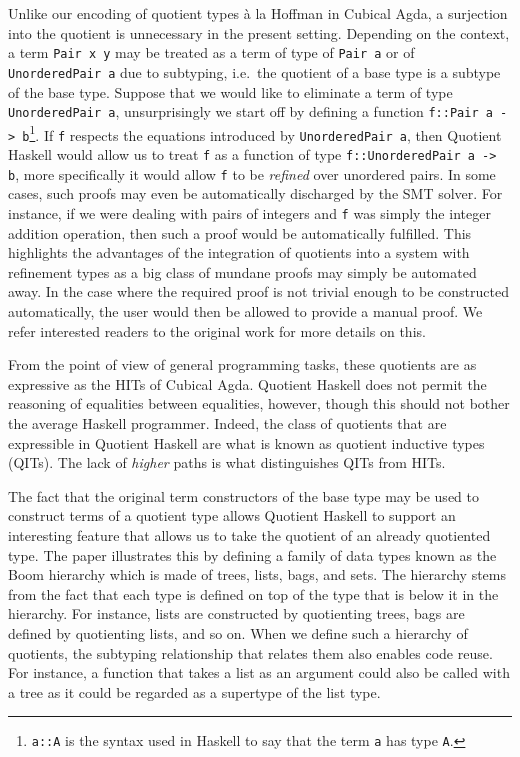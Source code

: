 \documentclass[12pt,twoside,maitrise]{dms}
\theoremstyle{definition}
\numberwithin{equation}{section}
\numberwithin{table}{chapter}
\numberwithin{figure}{chapter}
\newcommand\id[1] {\texttt{#1}}
\newcommand\fn[1] {\texttt{#1}}
\begin{document}
Unlike our encoding of quotient types à la Hoffman\cite{hofmann1995extensional}
in Cubical Agda, a surjection into the quotient is unnecessary in the present
setting. Depending on the context, a term \fn{Pair x y} may be treated as a term
of type of \fn{Pair a} or of \fn{UnorderedPair a} due to subtyping, i.e.\ the
quotient of a base type is a subtype of the base type. Suppose that we would
like to eliminate a term of type \fn{UnorderedPair a}, unsurprisingly we start
off by defining a function \fn{f::Pair a -> b}\footnote{\fn{a::A} is the syntax
used in Haskell to say that the term \id{a} has type \id{A}.}. If \id{f}
respects the equations introduced by \fn{UnorderedPair a}, then Quotient Haskell
would allow us to treat \id{f} as a function of type \fn{f::UnorderedPair a ->
  b}, more specifically it would allow \id{f} to be \emph{refined} over
unordered pairs. In some cases, such proofs may even be automatically discharged
by the SMT solver. For instance, if we were dealing with pairs of integers and
\id{f} was simply the integer addition operation, then such a proof would be
automatically fulfilled. This highlights the advantages of the integration of
quotients into a system with refinement types as a big class of mundane proofs
may simply be automated away. In the case where the required proof is not
trivial enough to be constructed automatically, the user would then be allowed
to provide a manual proof. We refer interested readers to the original work for
more details on this.

From the point of view of general programming tasks, these quotients are as
expressive as the HITs of Cubical Agda. Quotient Haskell does not permit the
reasoning of equalities between equalities, however, though this should not
bother the average Haskell programmer. Indeed, the class of quotients that are
expressible in Quotient Haskell are what is known as quotient inductive types
(QITs)\cite{fiore2022quotients, HoTTbook}. The lack of \emph{higher} paths is
what distinguishes QITs from HITs.

The fact that the original term constructors of the base type may be used to
construct terms of a quotient type allows Quotient Haskell to support an
interesting feature that allows us to take the quotient of an already quotiented
type. The paper illustrates this by defining a family of data types known as the
Boom hierarchy\cite{meertens1986algorithmics} which is made of trees, lists,
bags, and sets. The hierarchy stems from the fact that each type is defined on
top of the type that is below it in the hierarchy. For instance, lists are
constructed by quotienting trees, bags are defined by quotienting lists, and so
on. When we define such a hierarchy of quotients, the subtyping relationship
that relates them also enables code reuse. For instance, a function that takes a
list as an argument could also be called with a tree as it could be regarded as
a supertype of the list type.
\end{document}
